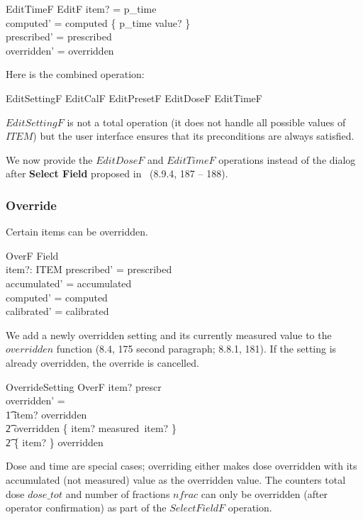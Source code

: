 \begin{schema}{EditTimeF}
	EditF
\where
	item? = p\_time \\
	computed' = computed \oplus \{ p\_time \mapsto value? \} \\
\also
	prescribed' = prescribed \\
	overridden' = overridden \\
\end{schema}
Here is the combined operation:

\begin{zed}
EditSettingF  
 EditCalF \lor EditPresetF \lor EditDoseF \lor EditTimeF
\end{zed}
$EditSettingF$ is not a total operation (it does not handle all
possible values of $ITEM$) but the user interface ensures that
its preconditions are always satisfied.

We now provide the $EditDoseF$ and $EditTimeF$ operations instead of
the dialog after {\bf Select Field} proposed in~\cite{jacky92}
(8.9.4, 187 -- 188).

\subsubsection{Override}

Certain items can be overridden.

\begin{schema}{OverF}
	\Delta Field \\
	item?: ITEM 
\where
	prescribed' = prescribed \\
	accumulated' = accumulated \\
	computed' = computed \\
	calibrated' = calibrated
\end{schema}
We add a newly overridden setting and its currently measured value
to the $overridden$ function (8.4, 175 second paragraph; 8.8.1, 181).
If the setting is already overridden, the override is cancelled.

\begin{schema}{OverrideSetting}
	OverF
\where
	item? \in prescr \\
overridden' = \\
\t1 \IF item? \notin \dom overridden \\
\t2	\THEN overridden \oplus \{ item? \mapsto measured~item? \} \\
\t2	\ELSE \{ item? \} \ndres overridden
\end{schema}
Dose and time are special cases; overriding either makes dose
overridden with its accumulated (not measured) value as
the overridden value.  The counters 
total dose $dose\_tot$ and number of fractions
$nfrac$ can only be overridden (after operator confirmation) as part
of the $SelectFieldF$ operation.

